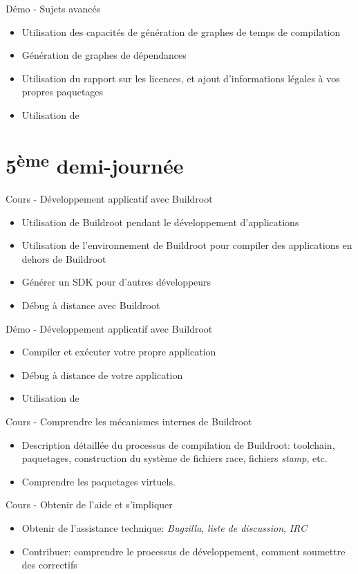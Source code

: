 \documentclass[a4paper,12pt,obeyspaces,spaces,hyphens]{article}
\begin{document}
\feagendaonecolumn
{Démo - Sujets avancés}
{
  \begin{itemize}
  \item Utilisation des capacités de génération de graphes de temps de
	compilation
  \item Génération de graphes de dépendances
  \item Utilisation du rapport sur les licences, et ajout d'informations
	légales à vos propres paquetages
  \item Utilisation de 
  \end{itemize}
}

\section{5\textsuperscript{ème} demi-journée}

\feagendatwocolumn
{Cours - Développement applicatif avec Buildroot}
{
  \begin{itemize}
  \item Utilisation de Buildroot pendant le développement d'applications
  \item Utilisation de l'environnement de Buildroot pour compiler des
	applications en dehors de Buildroot
  \item Générer un SDK pour d'autres développeurs
  \item Débug à distance avec Buildroot
  \end{itemize}
}
{Démo - Développement applicatif avec Buildroot}
{
  \begin{itemize}
  \item Compiler et exécuter votre propre application
  \item Débug à distance de votre application
  \item Utilisation de 
  \end{itemize}
}

\feagendatwocolumn
{Cours - Comprendre les mécanismes internes de Buildroot}
{
  \begin{itemize}
  \item Description détaillée du processus de compilation de Buildroot:
    	toolchain, paquetages, construction du système de fichiers race,
	fichiers {\em stamp}, etc.
  \item Comprendre les paquetages virtuels.
  \end{itemize}
}
{Cours - Obtenir de l'aide et s'impliquer}
{
  \begin{itemize}
  \item Obtenir de l'assistance technique: {\em Bugzilla}, {\em liste de
	discussion}, {\em IRC}
  \item Contribuer: comprendre le processus de développement, comment
    soumettre des correctifs
  \end{itemize}
}
\end{document}

